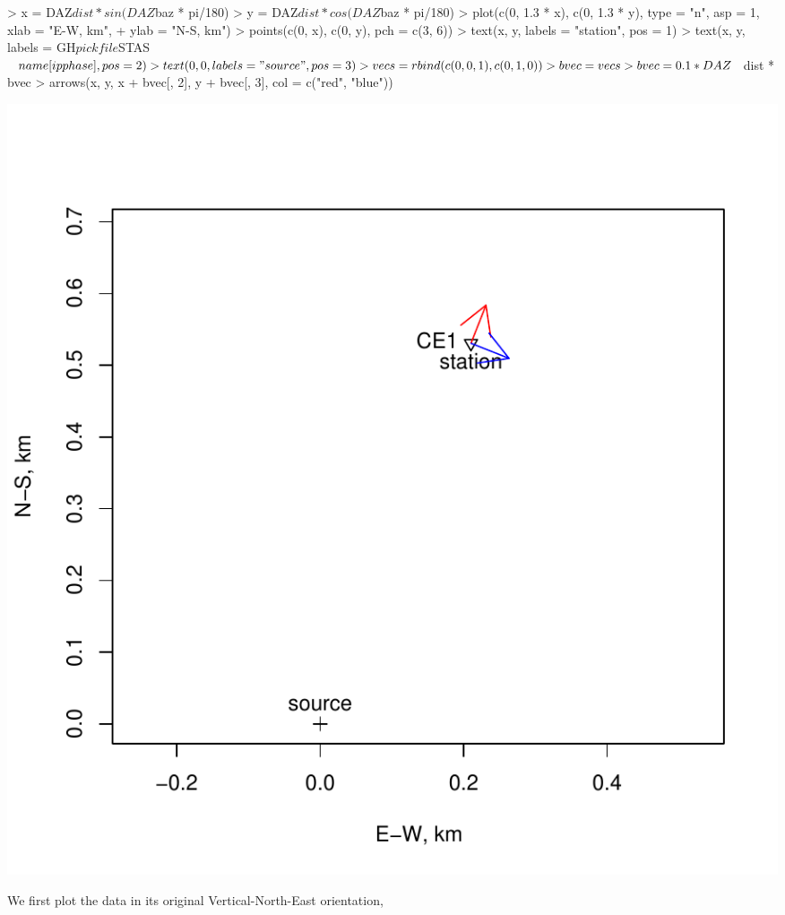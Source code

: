 \documentclass{article}
\begin{document}
\begin{Schunk}
\begin{Sinput}
> x = DAZ$dist * sin(DAZ$baz * pi/180)
> y = DAZ$dist * cos(DAZ$baz * pi/180)
> plot(c(0, 1.3 * x), c(0, 1.3 * y), type = "n", asp = 1, xlab = "E-W, km", 
+     ylab = "N-S, km")
> points(c(0, x), c(0, y), pch = c(3, 6))
> text(x, y, labels = "station", pos = 1)
> text(x, y, labels = GH$pickfile$STAS$name[ipphase], pos = 2)
> text(0, 0, labels = "source", pos = 3)
> vecs = rbind(c(0, 0, 1), c(0, 1, 0))
> bvec = vecs %
> bvec = 0.1 * DAZ$dist * bvec
> arrows(x, y, x + bvec[, 2], y + bvec[, 3], col = c("red", "blue"))
\end{Sinput}
\end{Schunk}
\includegraphics{hodo-007}


We first plot the data in its original Vertical-North-East orientation,
\end{document}
